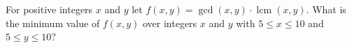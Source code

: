 For positive integers $x$ and $y$ let $f(x,y)=\gcd(x,y)\cdot\operatorname{lcm}(x,y)$. What is the minimum value of $f(x,y)$ over integers $x$ and $y$ with $5\le x\le10$ and $5\le y\le10$?
